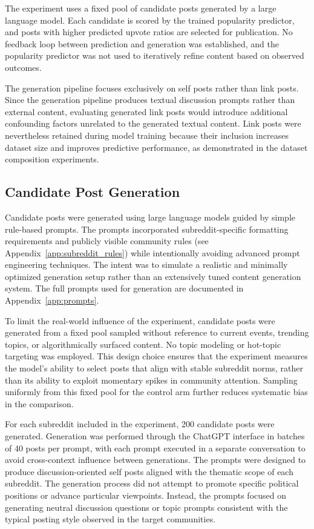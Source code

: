 The experiment uses a fixed pool of candidate posts generated by a large language model. Each candidate is scored by the trained popularity predictor, and posts with higher predicted upvote ratios are selected for publication. No feedback loop between prediction and generation was established, and the popularity predictor was not used to iteratively refine content based on observed outcomes.

The generation pipeline focuses exclusively on self posts rather than link posts. Since the generation pipeline produces textual discussion prompts rather than external content, evaluating generated link posts would introduce additional confounding factors unrelated to the generated textual content. Link posts were nevertheless retained during model training because their inclusion increases dataset size and improves predictive performance, as demonstrated in the dataset composition experiments.

\subsection{Candidate Post Generation}

Candidate posts were generated using large language models guided by simple rule-based prompts. The prompts incorporated subreddit-specific formatting requirements and publicly visible community rules (see Appendix~\ref{app:subreddit_rules}) while intentionally avoiding advanced prompt engineering techniques. The intent was to simulate a realistic and minimally optimized generation setup rather than an extensively tuned content generation system. The full prompts used for generation are documented in Appendix~\ref{app:prompts}.

To limit the real-world influence of the experiment, candidate posts were generated from a fixed pool sampled without reference to current events, trending topics, or algorithmically surfaced content. No topic modeling or hot-topic targeting was employed. This design choice ensures that the experiment measures the model's ability to select posts that align with stable subreddit norms, rather than its ability to exploit momentary spikes in community attention. Sampling uniformly from this fixed pool for the control arm further reduces systematic bias in the comparison.

For each subreddit included in the experiment, 200 candidate posts were generated. Generation was performed through the ChatGPT interface in batches of 40 posts per prompt, with each prompt executed in a separate conversation to avoid cross-context influence between generations. The prompts were designed to produce discussion-oriented self posts aligned with the thematic scope of each subreddit. The generation process did not attempt to promote specific political positions or advance particular viewpoints. Instead, the prompts focused on generating neutral discussion questions or topic prompts consistent with the typical posting style observed in the target communities.

